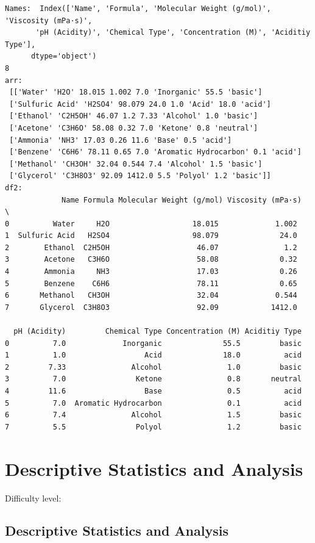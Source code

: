 \documentclass[
  letterpaper,
  DIV=11,
  numbers=noendperiod]{scrreprt}
\begin{document}
\begin{verbatim}
Names:  Index(['Name', 'Formula', 'Molecular Weight (g/mol)', 'Viscosity (mPa·s)',
       'pH (Acidity)', 'Chemical Type', 'Concentration (M)', 'Aciditiy Type'],
      dtype='object')
8
arr: 
 [['Water' 'H2O' 18.015 1.002 7.0 'Inorganic' 55.5 'basic']
 ['Sulfuric Acid' 'H2SO4' 98.079 24.0 1.0 'Acid' 18.0 'acid']
 ['Ethanol' 'C2H5OH' 46.07 1.2 7.33 'Alcohol' 1.0 'basic']
 ['Acetone' 'C3H6O' 58.08 0.32 7.0 'Ketone' 0.8 'neutral']
 ['Ammonia' 'NH3' 17.03 0.26 11.6 'Base' 0.5 'acid']
 ['Benzene' 'C6H6' 78.11 0.65 7.0 'Aromatic Hydrocarbon' 0.1 'acid']
 ['Methanol' 'CH3OH' 32.04 0.544 7.4 'Alcohol' 1.5 'basic']
 ['Glycerol' 'C3H8O3' 92.09 1412.0 5.5 'Polyol' 1.2 'basic']]
df2: 
             Name Formula Molecular Weight (g/mol) Viscosity (mPa·s)  \
0          Water     H2O                   18.015             1.002   
1  Sulfuric Acid   H2SO4                   98.079              24.0   
2        Ethanol  C2H5OH                    46.07               1.2   
3        Acetone   C3H6O                    58.08              0.32   
4        Ammonia     NH3                    17.03              0.26   
5        Benzene    C6H6                    78.11              0.65   
6       Methanol   CH3OH                    32.04             0.544   
7       Glycerol  C3H8O3                    92.09            1412.0   

  pH (Acidity)         Chemical Type Concentration (M) Aciditiy Type  
0          7.0             Inorganic              55.5         basic  
1          1.0                  Acid              18.0          acid  
2         7.33               Alcohol               1.0         basic  
3          7.0                Ketone               0.8       neutral  
4         11.6                  Base               0.5          acid  
5          7.0  Aromatic Hydrocarbon               0.1          acid  
6          7.4               Alcohol               1.5         basic  
7          5.5                Polyol               1.2         basic  
\end{verbatim}

\chapter{Descriptive Statistics and
Analysis}\label{descriptive-statistics-and-analysis}

Difficulty level: { }

\section*{Descriptive Statistics and
Analysis}\label{descriptive-statistics-and-analysis-1}
\end{document}
